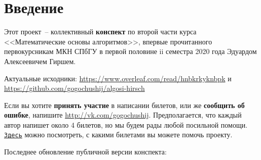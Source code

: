 \section*{Введение}

Этот проект~-- коллективный \textbf{конспект} по второй части курса <<Математические основы алгоритмов>>, впервые прочитанного первокурсникам МКН СПбГУ в первой половине ii семестра 2020 года Эдуардом Алексеевичем Гиршем.

Актуальные исходники: \url{https://www.overleaf.com/read/hnbkrkyknbpk} и \url{https://github.com/gogochushij/algosi-hirsch}

Если вы хотите \textbf{принять участие} в написании билетов, или же
\textbf{сообщить об ошибке}, напишите \url{http://vk.com/gogochushij}. Предполагается, что каждый автор напишет около 4 билетов, но мы будем рады любой посильной помощи. \href{https://docs.google.com/spreadsheets/d/17MKhLVzCyYvEKlm6W5Bb-6uUDNyv0QLmdvuh4N6JfXI/edit?usp=sharing}{\texttt{Здесь}} можно посмотреть, с какими билетами вы можете помочь проекту.

Последнее обновление публичной версии конспекта: \date{\today}
